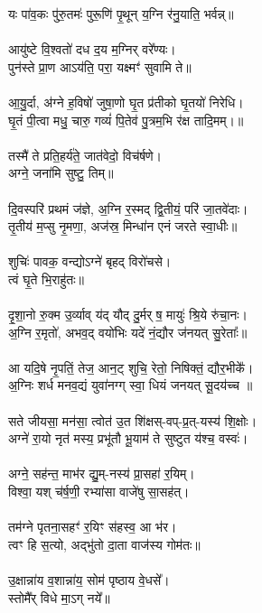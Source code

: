 यः पा॑व॒कः पु॑रु॒तमः॑ पुरू॒णि॑ पृ॒थून् य॒ग्नि र॑नु॒याति॒ भर्वन्न्॥\\
\\
आयु॑ष्टे वि॒श्वतो॑ दध द॒य म॒ग्निर् वरे᳚ण्यः।\\
पुन॑स्ते प्रा॒ण आऽय॑ति॒ परा॒ यक्ष्मꣳ॑ सुवामि ते॥\\
\\
आ॒यु॒र्दा, अ॑ग्ने ह॒विषो॑ जुषा॒णो घृ॒त प्र॑तीको घृ॒तयो॑ निरेधि।\\
घृ॒तं पी॒त्वा मधु॒ चारु॒ गव्यं॑ पि॒तेव॑ पु॒त्रम॒भि र॑क्ष तादि॒मम्।॥\\
\\
तस्मै॑ ते प्रति॒हर्य॑ते॒ जात॑वेदो॒ विच॑र्षणे।\\
अग्ने॒ जना॑मि सुष्टु॒ तिम्॥\\
\\
दि॒वस्परि॑ प्रथमं ज॑ज्ञे, अ॒ग्नि र॒स्मद् द्वि॒तीयं॒ परि॑ जा॒तवे॑दाः।\\
तृ॒तीय॑ म॒प्सु नृ॒मणा॒, अज॑स्र॒ मिन्धा॑न एनं जरते स्वा॒धीः॥\\
\\
शुचिः॑ पावक॒ वन्द्योऽग्ने॑ बृहद् विरो॑चसे।\\
त्वं घृ॒ते भि॒राहु॑तः॥\\
\\
दृ॒शा॒नो रु॒क्म उ॒र्व्याव् य॑द् यौद् दु॒र्मर् ष॒ मायुः॑ श्रि॒ये रु॑चा॒नः।\\
अ॒ग्नि र॒मृतो॑, अभव॒द् वयो॑भिः यदे॑ नं॒द्यौर ज॑नयत् सु॒रेताः᳚॥\\
\\
आ यदि॒षे नृ॒पतिं॒ तेज॒ आन॒ट् शुचि॒ रेतो॒ निषिक्तं॒ द्यौर॒भीके᳚।\\
अ॒ग्निः शर्ध मनव॒द्यं युवा॑नग्ग् स्वा॒ धियं जनयत् सू॒दय॑च्च ॥\\
\\
सते जीयसा॒ मन॑सा॒ त्वोत॑ उ॒त शि॑क्षस्-वप्-प्र॒त्-यस्य॑ शि॒क्षोः।\\
अग्ने॑ रा॒यो नृत॑ मस्य॒ प्रभू॑तौ भू॒याम॑ ते सुष्टुत य॑श्च॒ वस्वः॑।\\
\\
अग्ने॒ सह॑न्त॒ माभ॑र द्यु॒म्-नस्य॑  प्रा॒सहा॑ र॒यिम्।\\
विश्वा॒ यश् च॑र्ष॒णी॒ रभ्या॑सा वाजे॑षु सा॒सह॑त्।\\
\\
तम॑ग्ने पृतना॒सहꣳ॑ र॒यिꣳ स॑हस्व॒ आ भ॑र।\\
त्वꣳ हि स॒त्यो, अद्भु॑तो दा॒ता वाज॑स्य गोम॑तः॥\\
\\
उ॒क्षान्ना॑य व॒शान्ना॑य॒ सोम॑ पृष्ठाय वे॒धसे᳚।\\
स्तोमै᳚र् विधे मा॒ऽग् नये᳚॥\\
